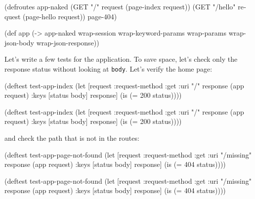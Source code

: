 \else

\begin{english}
  \begin{clojure}
(defroutes app-naked
  (GET "/"      request (page-index request))
  (GET "/hello" request (page-hello request))
  page-404)

(def app
  (-> app-naked
      wrap-session
      wrap-keyword-params
      wrap-params
      wrap-json-body
      wrap-json-response))
  \end{clojure}
\end{english}

\fi

Let's write a few tests for the application. To save space, let's check only the response status without looking at \verb|body|. Let's verify the home page:

\ifnarrow

\begin{english}
  \begin{clojure}
(deftest test-app-index
  (let [request {:request-method :get
                 :uri "/"}
        response (app request)
        {:keys [status body]} response]
    (is (= 200 status))))
  \end{clojure}
\end{english}

\else

\begin{english}
  \begin{clojure}
(deftest test-app-index
  (let [request {:request-method :get :uri "/"}
        response (app request)
        {:keys [status body]} response]
    (is (= 200 status))))
  \end{clojure}
\end{english}

\fi

\noindent
and check the path that is not in the routes:

\ifnarrow

\begin{english}
  \begin{clojure}
(deftest test-app-page-not-found
  (let [request {:request-method :get
                 :uri "/missing"}
        response (app request)
        {:keys [status body]} response]
    (is (= 404 status))))
  \end{clojure}
\end{english}

\else

\begin{english}
  \begin{clojure}
(deftest test-app-page-not-found
  (let [request {:request-method :get :uri "/missing"}
        response (app request)
        {:keys [status body]} response]
    (is (= 404 status))))
  \end{clojure}
\end{english}

